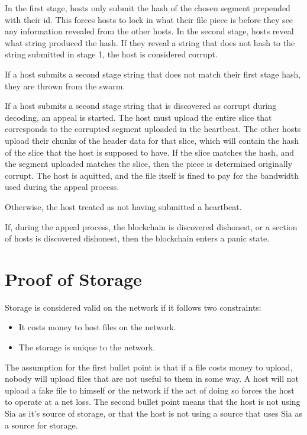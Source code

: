 \documentclass[twocolumn]{article}
\begin{document}
In the first stage, hosts only submit the hash of the chosen segment prepended with their id.
This forces hosts to lock in what their file piece is before they see any information revealed from the other hosts.
In the second stage, hosts reveal what string produced the hash.
If they reveal a string that does not hash to the string submitted in stage 1, the host is considered corrupt.

If a host submits a second stage string that does not match their first stage hash, they are thrown from the swarm.

If a host submits a second stage string that is discovered as corrupt during decoding, an appeal is started.
The host must upload the entire slice that corresponds to the corrupted segment uploaded in the heartbeat.
The other hosts upload their chunks of the header data for that slice, which will contain the hash of the slice that the host is supposed to have.
If the slice matches the hash, and the segment uploaded matches the slice, then the piece is determined originally corrupt.
The host is aquitted, and the file itself is fined to pay for the bandwidth used during the appeal process.

Otherwise, the host treated as not having submitted a heartbeat.

If, during the appeal process, the blockchain is discovered dishonest, or a section of hosts is discovered dishonest, then the blockchain enters a panic state.

\section{Proof of Storage}

Storage is considered valid on the network if it follows two constraints:

\begin{itemize}
	\item It costs money to host files on the network.
	\item The storage is unique to the network.
\end{itemize}

The assumption for the first bullet point is that if a file costs money to upload, nobody will upload files that are not useful to them in some way.
A host will not upload a fake file to himself or the network if the act of doing so forces the host to operate at a net loss.
The second bullet point means that the host is not using Sia as it's source of storage, or that the host is not using a source that uses Sia as a source for storage.
\end{document}
